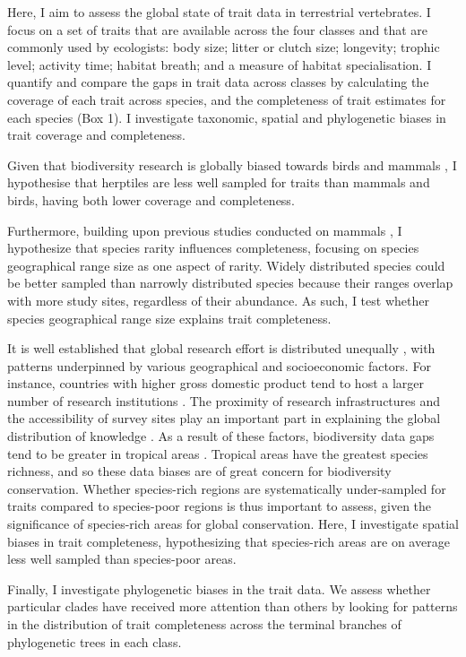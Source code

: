 Here, I aim to assess the global state of trait data in terrestrial vertebrates. I focus on a set of traits that are available across the four classes and that are commonly used by ecologists: body size; litter or clutch size; longevity; trophic level; activity time; habitat breath; and a measure of habitat specialisation. I quantify and compare the gaps in trait data across classes by calculating the coverage of each trait across species, and the completeness of trait estimates for each species (Box 1). I investigate taxonomic, spatial and phylogenetic biases in trait coverage and completeness.

Given that biodiversity research is globally biased towards birds and mammals \citep{Titley2017}, I hypothesise that herptiles are less well sampled for traits than mammals and birds, having both lower coverage and completeness.

Furthermore, building upon previous studies conducted on mammals \citep{Gonzalez-Suarez2012}, I hypothesize that species rarity influences completeness, focusing on species geographical range size as one aspect of rarity. Widely distributed species could be better sampled than narrowly distributed species because their ranges overlap with more study sites, regardless of their abundance. As such, I test whether species geographical range size explains trait completeness. 

It is well established that global research effort is distributed unequally \citep{ONU2015}, with patterns underpinned by various geographical and socioeconomic factors. For instance, countries with higher gross domestic product tend to host a larger number of research institutions \citep{Martin2012}. The proximity of research infrastructures and the accessibility of survey sites play an important part in explaining the global distribution of knowledge \citep{Hortal2015}. As a result of these factors, biodiversity data gaps tend to be greater in tropical areas \citep{Collen2008}. Tropical areas have the greatest species richness, and so these data biases are of great concern for biodiversity conservation. Whether species-rich regions are systematically under-sampled for traits compared to species-poor regions is thus important to assess, given the significance of species-rich areas for global conservation. Here, I investigate spatial biases in trait completeness, hypothesizing that species-rich areas are on average less well sampled than species-poor areas.

Finally, I investigate phylogenetic biases in the trait data. We assess whether particular clades have received more attention than others by looking for patterns in the distribution of trait completeness across the terminal branches of phylogenetic trees in each class.

